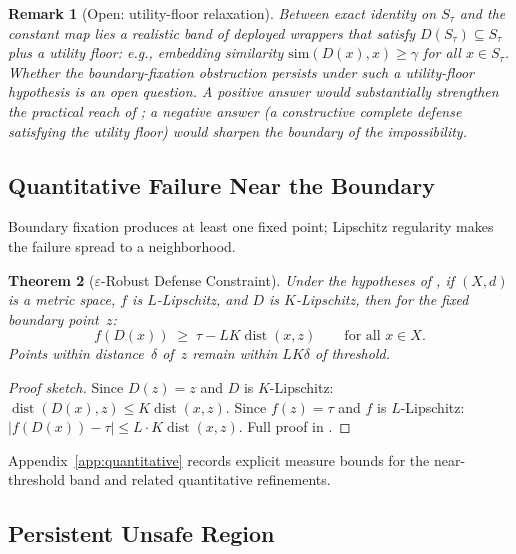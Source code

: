 \documentclass[11pt]{article}
\newtheorem{theorem}{Theorem}[section]
\newtheorem{remark}[theorem]{Remark}
\newcommand{\dist}{\operatorname{dist}}
\begin{document}
\begin{remark}[Open: utility-floor relaxation]
\label{rem:utility-floor}
Between exact identity on $S_\tau$ and the constant map lies a
realistic band of deployed wrappers that satisfy
$D(S_\tau) \subseteq S_\tau$ plus a \emph{utility floor}: e.g.,
embedding similarity $\mathrm{sim}(D(x), x) \geq \gamma$ for all
$x \in S_\tau$. Whether the boundary-fixation obstruction persists
under such a utility-floor hypothesis is an open question.
A positive answer would substantially strengthen the practical reach
of ; a negative answer (a constructive complete
defense satisfying the utility floor) would sharpen the boundary of
the impossibility.
\end{remark}


\subsection{Quantitative Failure Near the Boundary}
\label{sec:eps-robust}

Boundary fixation produces at least one fixed point; Lipschitz
regularity makes the failure spread to a neighborhood.

\begin{theorem}[$\varepsilon$-Robust Defense Constraint]
\label{thm:eps-robust}
Under the hypotheses of , if $(X,d)$ is a metric
space, $f$ is $L$-Lipschitz, and $D$ is $K$-Lipschitz, then for
the fixed boundary point~$z$:
\begin{equation}
  f(D(x)) \;\geq\; \tau - LK\dist(x, z)
  \qquad \text{for all } x \in X.
\end{equation}
Points within distance~$\delta$ of~$z$ remain within
$LK\delta$ of threshold.
\end{theorem}

\begin{proof}[Proof sketch]
Since $D(z)=z$ and $D$ is $K$-Lipschitz:
$\dist(D(x),z) \leq K\dist(x,z)$. Since $f(z)=\tau$ and $f$ is
$L$-Lipschitz:
$|f(D(x)) - \tau| \leq L \cdot K\dist(x,z)$.
Full proof in .
\end{proof}

Appendix~\ref{app:quantitative} records explicit measure bounds for the
near-threshold band and related quantitative refinements.

\subsection{Persistent Unsafe Region}
\label{sec:persistent}
\end{document}
